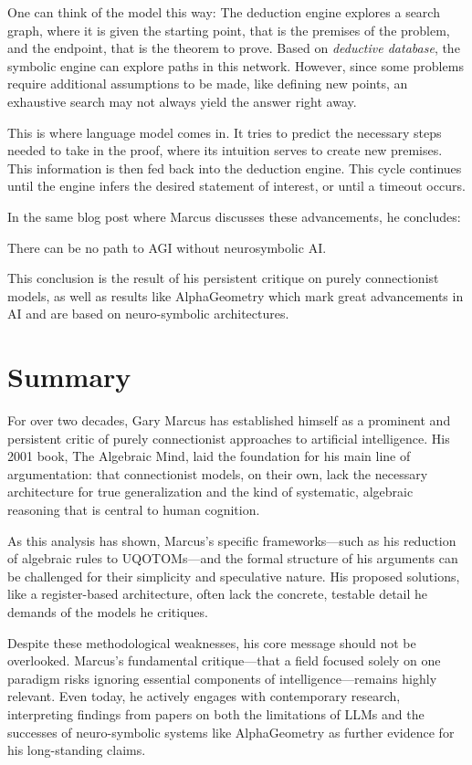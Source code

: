 \documentclass[../../main.tex]{subfiles}
\begin{document}
One can think of the model this way: The deduction engine explores a search graph, where it is given the starting point, that is the premises of the problem, and the endpoint, that is the theorem to prove. Based on \emph{deductive database}, the symbolic engine can explore paths in this network. However, since some problems require additional assumptions to be made, like defining new points, an exhaustive search may not always yield the answer right away.

This is where language model comes in. It tries to predict the necessary steps needed to take in the proof, where its intuition serves to create new premises. This information is then fed back into the deduction engine. This cycle continues until the engine infers the desired statement of interest, or until a timeout occurs.

\bigskip
In the same blog post where Marcus discusses these advancements, he concludes:

\begin{citecallout}
    There can be no path to AGI without neurosymbolic AI.
\end{citecallout}

This conclusion is the result of his persistent critique on purely connectionist models, as well as results like AlphaGeometry which mark great advancements in AI and are based on neuro-symbolic architectures.

\chapter{Summary}
For over two decades, Gary Marcus has established himself as a prominent and persistent critic of purely connectionist approaches to artificial intelligence. His 2001 book, The Algebraic Mind, laid the foundation for his main line of argumentation: that connectionist models, on their own, lack the necessary architecture for true generalization and the kind of systematic, algebraic reasoning that is central to human cognition.

As this analysis has shown, Marcus's specific frameworks—such as his reduction of algebraic rules to UQOTOMs—and the formal structure of his arguments can be challenged for their simplicity and speculative nature. His proposed solutions, like a register-based architecture, often lack the concrete, testable detail he demands of the models he critiques.

Despite these methodological weaknesses, his core message should not be overlooked. Marcus’s fundamental critique—that a field focused solely on one paradigm risks ignoring essential components of intelligence—remains highly relevant. Even today, he actively engages with contemporary research, interpreting findings from papers on both the limitations of LLMs and the successes of neuro-symbolic systems like AlphaGeometry as further evidence for his long-standing claims.
\end{document}

